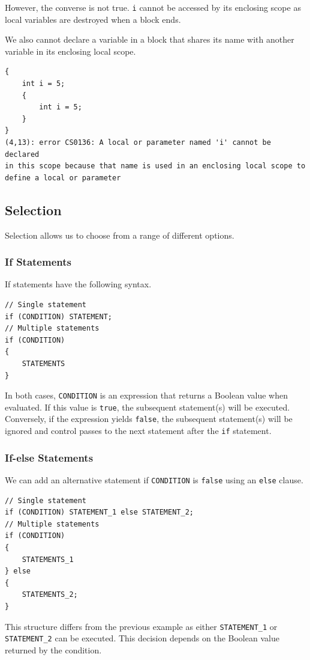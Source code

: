 \documentclass{article}
\def\customlinemarker#1#2{
    \edef\thelstnumber{%
        \unexpanded{%
            \ifnum#1=\value{lstnumber}\relax
              #2%
            \fi}%
        \ifx\thelstnumber\relax\else
        \expandafter\unexpanded\expandafter{\thelstnumber}%
        \fi
    }
}
\begin{document}
However, the converse is not true. \lstinline{i} cannot be accessed by its enclosing scope
as local variables are destroyed when a block ends.

We also cannot declare a variable in a block that shares its name
with another variable in its enclosing local scope.
\begingroup
\let\thelstnumber\relax
\customlinemarker{1}{\$}
\customlinemarker{2}{.}
\customlinemarker{3}{.}
\customlinemarker{4}{.}
\customlinemarker{5}{.}
\customlinemarker{6}{.}
\begin{lstlisting}
{
    int i = 5;
    {
        int i = 5;
    }   
}
(4,13): error CS0136: A local or parameter named 'i' cannot be declared
in this scope because that name is used in an enclosing local scope to 
define a local or parameter
\end{lstlisting}
\endgroup
\subsection{Selection}
Selection allows us to choose from a range of different options.
\subsubsection{If Statements}
If statements have the following syntax.
\begin{lstlisting}[numbers=none]
// Single statement
if (CONDITION) STATEMENT;
// Multiple statements
if (CONDITION)
{
    STATEMENTS
}
\end{lstlisting}
In both cases, \lstinline{CONDITION} is an expression that returns a Boolean value %
when evaluated. If this value is \lstinline{true}, the subsequent statement(s) will
be executed. Conversely, if the expression yields \lstinline{false}, the subsequent
statement(s) will be ignored and control passes to the next statement after the \lstinline{if}
statement.
\subsubsection{If-else Statements}
We can add an alternative statement if \lstinline{CONDITION} is \lstinline{false} using an \lstinline{else} %
clause.
\begin{lstlisting}[numbers=none]
// Single statement
if (CONDITION) STATEMENT_1 else STATEMENT_2;
// Multiple statements
if (CONDITION) 
{
    STATEMENTS_1
} else
{
    STATEMENTS_2;
}
\end{lstlisting}
This structure differs from the previous example as either \lstinline{STATEMENT_1} or \lstinline{STATEMENT_2}
can be executed. This decision depends on the Boolean value returned by the condition.
\end{document}
